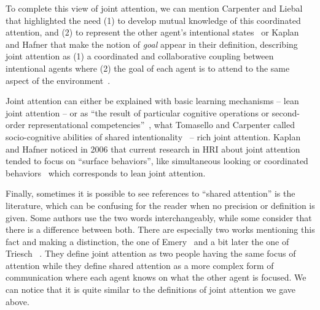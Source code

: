 \documentclass[a4paper,11pt,twoside]{StyleThese}
\begin{document}
To complete this view of joint attention, we can mention Carpenter and Liebal that highlighted the need (1) to develop mutual knowledge of this coordinated attention, and (2) to represent the other agent’s intentional states~\cite{carpenter_2011_joint} or Kaplan and Hafner that make the notion of \textit{goal} appear in their definition, describing joint attention as (1) a coordinated and collaborative coupling between intentional agents where (2) the goal of each agent is to attend to the same aspect of the environment~\cite{kaplan_2006_challenges}.

Joint attention can either be explained with basic learning mechanisms -- lean joint attention -- or as ``the result of particular cognitive operations or second-order representational competencies''~\cite{racine_2011_getting}, \ie what Tomasello and Carpenter called socio-cognitive abilities of shared intentionality~\cite{tomasello_2007_shared} -- rich joint attention. Kaplan and Hafner noticed in 2006 that current research in HRI about joint attention tended to focus on ``surface behaviors'', like simultaneous looking or coordinated behaviors~\cite{kaplan_2006_challenges} which corresponds to lean joint attention.

Finally, sometimes it is possible to see references to ``shared attention'' is the literature, which can be confusing for the reader when no precision or definition is given. Some authors use the two words interchangeably, while some consider that there is a difference between both. There are especially two works mentioning this fact and making a distinction, the one of Emery~\cite{emery_2000_eyes} and a bit later the one of Triesch \etal~\cite{triesch_2006_gaze}. They define joint attention as two people having the same focus of attention while they define shared attention as a more complex form of communication where each agent knows on what the other agent is focused. We can notice that it is quite similar to the definitions of joint attention we gave above.
\end{document}
